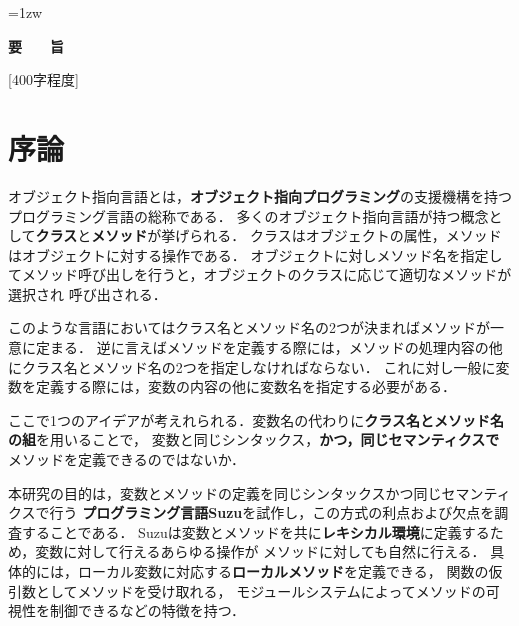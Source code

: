 \documentclass[a4paper,11pt,dvipdfmx]{jreport}
\title{\Underline{レキシカル環境にメソッドを定義する\\オブジェクト指向言語Suzu}}
\author{林 拓人}
\begin{document}
\maketitle
\thispagestyle{empty}
\newpage

\thispagestyle{empty}
\vspace*{20pt plus 1fil}
\parindent=1zw
\noindent
\begin{center}
{\Large \bf 要　　旨}
\vspace{2cm}
\end{center}
[400字程度]

\par
\vspace{0pt plus 1fil}
\newpage

\tableofcontents

\pagebreak \setcounter{page}{1}


\chapter{序論}

オブジェクト指向言語とは，\textbf{オブジェクト指向プログラミング}の支援機構を持つプログラミング言語の総称である．
多くのオブジェクト指向言語が持つ概念として\textbf{クラス}と\textbf{メソッド}が挙げられる．
クラスはオブジェクトの属性，メソッドはオブジェクトに対する操作である．
オブジェクトに対しメソッド名を指定してメソッド呼び出しを行うと，オブジェクトのクラスに応じて適切なメソッドが選択され
呼び出される．

このような言語においてはクラス名とメソッド名の2つが決まればメソッドが一意に定まる．
逆に言えばメソッドを定義する際には，メソッドの処理内容の他にクラス名とメソッド名の2つを指定しなければならない．
これに対し一般に変数を定義する際には，変数の内容の他に変数名を指定する必要がある．

ここで1つのアイデアが考えれられる．変数名の代わりに\textbf{クラス名とメソッド名の組}を用いることで，
変数と同じシンタックス，\textbf{かつ，同じセマンティクスで}メソッドを定義できるのではないか．

本研究の目的は，変数とメソッドの定義を同じシンタックスかつ同じセマンティクスで行う
\textbf{プログラミング言語Suzu}を試作し，この方式の利点および欠点を調査することである．
Suzuは変数とメソッドを共に\textbf{レキシカル環境}に定義するため，変数に対して行えるあらゆる操作が
メソッドに対しても自然に行える．
具体的には，ローカル変数に対応する\textbf{ローカルメソッド}を定義できる，
関数の仮引数としてメソッドを受け取れる，
モジュールシステムによってメソッドの可視性を制御できるなどの特徴を持つ．
\end{document}
